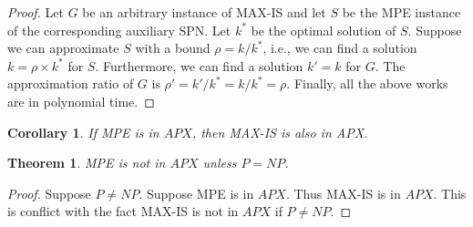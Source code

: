\documentclass{article}
\newtheorem{theorem}{Theorem}[section]
\newtheorem{corollary}{Corollary}[theorem]
\theoremstyle{remark}
\theoremstyle{definition}
\begin{document}
\begin{proof}
Let $G$ be an arbitrary instance of MAX-IS and let $S$ be the MPE instance of the corresponding auxiliary SPN. Let $k^\ast$ be the optimal solution of $S$. Suppose we can approximate $S$ with a bound $\rho=k/k^\ast$, i.e., we can find a solution $k=\rho \times k^\ast$ for $S$. Furthermore, we can find a solution $k' = k$ for $G$. The approximation ratio of $G$ is $\rho'=k'/k^\ast = k/k^\ast = \rho$. Finally, all the above works are in polynomial time.
\end{proof}

\begin{corollary}
If MPE is in $APX$, then MAX-IS is also in APX.
\end{corollary}

\begin{theorem}
MPE is not in $APX$ unless $P=NP$.
\end{theorem}
\begin{proof}
Suppose $P \neq NP$. Suppose MPE is in $APX$. Thus MAX-IS is in $APX$. This is conflict with the fact MAX-IS is not in $APX$ if $P \neq NP$.
\end{proof}
\end{document}
